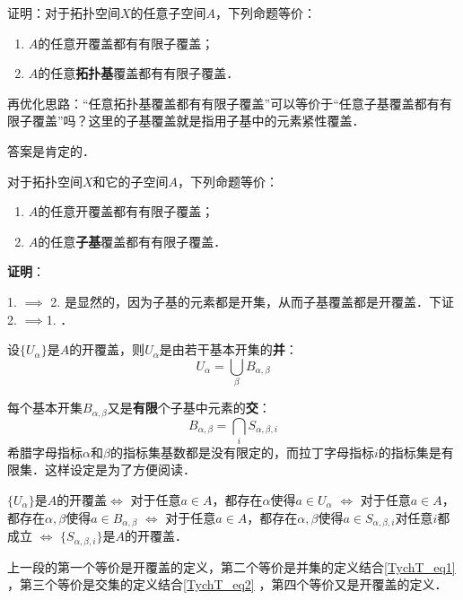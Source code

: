 \begin{exercise}{}
证明：对于拓扑空间$X$的任意子空间$A$，下列命题等价：
\begin{enumerate}
\item $A$的任意开覆盖都有有限子覆盖；
\item $A$的任意\textbf{拓扑基}覆盖都有有限子覆盖．
\end{enumerate}
\end{exercise}

再优化思路：“任意拓扑基覆盖都有有限子覆盖”可以等价于“任意子基覆盖都有有限子覆盖”吗？这里的子基覆盖就是指用子基中的元素紧性覆盖．

答案是肯定的．

\begin{theorem}{}
对于拓扑空间$X$和它的子空间$A$，下列命题等价：
\begin{enumerate}
\item $A$的任意开覆盖都有有限子覆盖；
\item $A$的任意\textbf{子基}覆盖都有有限子覆盖．
\end{enumerate}
\end{theorem}

\textbf{证明}：

1. $\implies$ 2. 是显然的，因为子基的元素都是开集，从而子基覆盖都是开覆盖．下证 2. $\implies$1. ．

设$\{U_\alpha\}$是$A$的开覆盖，则$U_\alpha$是由若干基本开集的\textbf{并}：
\begin{equation}\label{TychT_eq1}
U_\alpha = \bigcup_{\beta} B_{\alpha, \beta}
\end{equation}

每个基本开集$B_{\alpha, \beta}$又是\textbf{有限}个子基中元素的\textbf{交}：
\begin{equation}\label{TychT_eq2}
B_{\alpha, \beta} = \bigcap_{i} S_{\alpha, \beta, i}
\end{equation}
希腊字母指标$\alpha$和$\beta$的指标集基数都是没有限定的，而拉丁字母指标$i$的指标集是有限集．这样设定是为了方便阅读．

$\{U_\alpha\}$是$A$的开覆盖$\iff$ 对于任意$a\in A$，都存在$\alpha$使得$a\in U_\alpha$ $\iff$ 对于任意$a\in A$，都存在$\alpha, \beta$使得$a\in B_{\alpha, \beta}$ $\iff$ 对于任意$a\in A$，都存在$\alpha, \beta$使得$a\in S_{\alpha, \beta, i}$对任意$i$都成立 $\iff$ $\{S_{\alpha, \beta, i}\}$是$A$的开覆盖．

上一段的第一个等价是开覆盖的定义，第二个等价是并集的定义结合\autoref{TychT_eq1} ，第三个等价是交集的定义结合\autoref{TychT_eq2} ，第四个等价又是开覆盖的定义．

